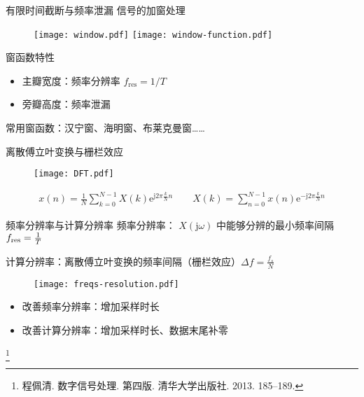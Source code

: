 \documentclass[UTF8]{ctexbeamer}
\begin{document}
\begin{frame}{有限时间截断与频率泄漏}
    信号的加窗处理
    \begin{figure}
        \centering
        \texttt{[image: window.pdf]}
        \hspace{20pt}
        \texttt{[image: window-function.pdf]}
    \end{figure}

    窗函数特性
    \begin{itemize}
        \item 主瓣宽度：频率分辨率 $f_\mathrm{res} = 1/T$ 
        \item 旁瓣高度：频率泄漏
    \end{itemize}

    常用窗函数：汉宁窗、海明窗、布莱克曼窗……
\end{frame}


\begin{frame}{离散傅立叶变换与栅栏效应}
    \begin{figure}
        \centering
        \texttt{[image: DFT.pdf]}
    \end{figure}
    \vspace{\fill}
    \begin{tcolorbox}[top=0mm,
        title = 离散傅立叶变换（Discrete Fourier Transform） ,
        boxrule = 0.3pt,
        fontupper = \normalcolor\small]
        \begin{gather*}
            x(n) = \frac{1}{N} \sum_{k=0}^{N-1} X(k) \mathrm{e}^{\mathrm{j} 2\pi\frac{k}{N} n} 
            \qquad
            X(k) = \sum_{n=0}^{N-1} x(n) \mathrm{e}^{-\mathrm{j} 2\pi\frac{k}{N} n}            
        \end{gather*}
    \end{tcolorbox}
\end{frame}



\begin{frame}{频率分辨率与计算分辨率}
    频率分辨率： $X(\mathrm{j}\omega)$ 中能够分辨的最小频率间隔 $f_{\rm res} = \frac{1}{T}$
    
    计算分辨率：离散傅立叶变换的频率间隔（栅栏效应）$\Delta f = \frac{f_s}{N}$

    \begin{figure}
        \centering
        \texttt{[image: freqs-resolution.pdf]}
    \end{figure}

    \begin{itemize}
        \item 改善频率分辨率：增加采样时长
        \item 改善计算分辨率：增加采样时长、数据末尾补零
    \end{itemize}
    \footnote{程佩清. 数字信号处理. 第四版. 清华大学出版社. 2013. 185--189.}
\end{frame}
\end{document}
